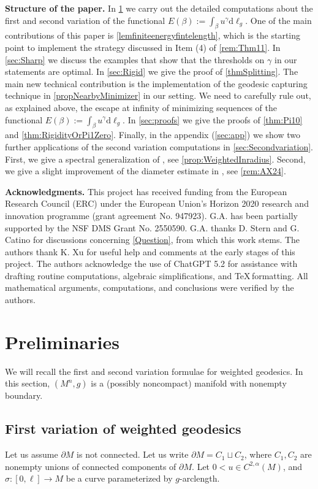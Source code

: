 \documentclass[12pt,a4paper,reqno]{amsart}
\theoremstyle{definition}
\begin{document}
\textbf{Structure of the paper.} In \cref{sec:Preliminaries} we carry out the detailed computations about the first and second variation of the functional $E(\beta):=\int_\beta u^\gamma\mathrm{d}\ell_g$. One of the main contributions of this paper is \cref{lemfiniteenergyfintelength}, which is the starting point to implement the strategy discussed in Item (4) of \cref{rem:Thm11}. In \cref{sec:Sharp} we discuss the examples that show that the thresholds on $\gamma$ in our statements are optimal. In \cref{sec:Rigid} we give the proof of \cref{thmSplitting}. The main new technical contribution is the implementation of the geodesic capturing technique in \cref{propNearbyMinimizer} in our setting. We need to carefully rule out, as explained above, the escape at infinity of minimizing sequences of the functional $E(\beta):=\int_\beta u^\gamma\mathrm{d}\ell_g$. In \cref{sec:proofs} we give the proofs of \cref{thm:Pi10} and \cref{thm:RigidityOrPi1Zero}. Finally, in the appendix (\cref{sec:app}) we show two further applications of the second variation computations in \cref{sec:Secondvariation}. First, we give a spectral generalization of \cite{MartinLiASharpComparison}, see \cref{prop:WeightedInradius}. Second, we give a slight improvement of the diameter estimate in \cite{AX24}, see \cref{rem:AX24}.
\smallskip

\textbf{Acknowledgments.} This project has received funding from the European Research Council (ERC) under
the European Union’s Horizon 2020 research and innovation programme (grant agreement
No. 947923). G.A. has been partially supported by the NSF DMS Grant No. 2550590. G.A. thanks D. Stern and G. Catino for discussions concerning
\cref{Question}, from which this work stems. The authors thank K. Xu for useful help and comments at the early stages of this project. The authors acknowledge the use of ChatGPT 5.2 for assistance with drafting routine computations, algebraic simplifications, and \TeX\,formatting. All mathematical arguments, computations, and conclusions were verified by the authors.

\section{Preliminaries}\label{sec:Preliminaries}

We will recall the first and second variation formulae for weighted geodesics. In this section, $(M^n,g)$ is a (possibly noncompact) manifold with nonempty boundary.


\subsection{First variation of weighted geodesics}\label{sec:FirstVariation}
    Let us assume $\partial M$ is not connected. Let us write $\partial M=C_1\sqcup C_2$, where $C_1,C_2$ are nonempty unions of connected components of $\partial M$. 
    Let $0<u\in C^{2,\alpha}(M)$, and
     $\sigma:[0,\ell]\to M$ be a curve parameterized by $g$-arclength. 
     
\end{document}

